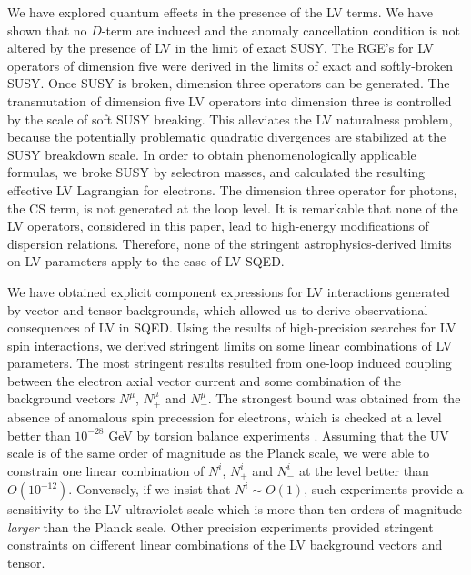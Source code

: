 \documentclass[12pt]{revtex4}
\begin{document}
We have explored quantum effects in the presence of the 
LV terms. We have shown that no $D$-term are induced and 
the anomaly cancellation condition is not altered by the presence of
LV in the limit of exact SUSY. The RGE's for LV operators of dimension
five were derived in the limits of exact and softly-broken SUSY. Once
SUSY is broken, dimension three operators can be generated.  
The transmutation of dimension five LV operators into dimension three
is controlled by the scale of soft SUSY breaking. This alleviates the 
LV naturalness problem, because the potentially problematic quadratic
divergences are stabilized at the SUSY breakdown scale.
In order to obtain phenomenologically applicable formulas, we broke
SUSY by selectron masses, and calculated the resulting effective
LV Lagrangian for electrons. The dimension three
operator for photons, the CS term, is not generated at the
loop level. It is remarkable that none of the LV operators, considered
in this paper, lead to high-energy modifications of dispersion relations.  
Therefore, none of the stringent astrophysics-derived limits on LV
parameters  \cite{Ted1,GK} apply to the case of LV SQED. 


We have obtained explicit component expressions for LV
interactions generated by vector and tensor backgrounds, which allowed
us to derive observational consequences of LV in SQED. Using the results
of high-precision searches for LV spin interactions, we derived  
stringent limits on some linear combinations of LV parameters. The most
stringent results resulted from one-loop induced coupling between the
electron axial vector current and some combination of the background
vectors $N^\mu$, $N^\mu_+$ and $N^{\mu}_-$. The strongest bound was
obtained from the absence of anomalous spin precession for electrons,
which is checked at a level better than $10^{-28}$ GeV by
torsion balance experiments \cite{Heckel:1999sy}. Assuming that the UV
scale is of the same order of magnitude as the Planck scale, 
we were able to constrain one linear combination of $N^i$, $N^i_+$ and
$N^i_-$ at the level better than $O(10^{-12})$. Conversely, if we
insist that $N^i \sim O(1)$,  such experiments provide a sensitivity to
the LV ultraviolet scale which is more than ten orders of magnitude
{\em larger} than the Planck scale. Other precision experiments
\cite{clock1,clock2} provided stringent constraints on different
linear combinations of the LV background vectors and tensor.
\end{document}
